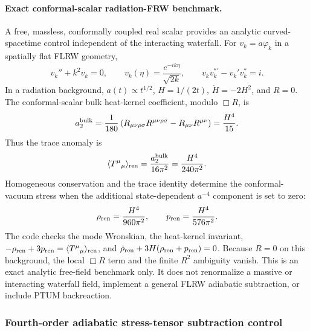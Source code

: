 \documentclass[epj]{svjour}
\begin{document}
\paragraph{Exact conformal-scalar radiation-FRW benchmark.}
A free, massless, conformally coupled real scalar provides an analytic
curved-spacetime control independent of the interacting waterfall.
For $v_k=a\varphi_k$ in a spatially flat FLRW geometry,
\begin{equation}
v_k''+k^2v_k=0,\qquad
v_k(\eta)=\frac{e^{-ik\eta}}{\sqrt{2k}},\qquad
v_kv_k^{*'}-v_k'v_k^*=i .
\end{equation}
In a radiation background, $a(t)\propto t^{1/2}$,
$H=1/(2t)$, $\dot H=-2H^2$, and $R=0$. The conformal-scalar
bulk heat-kernel coefficient, modulo $\Box R$, is
\begin{equation}
a_2^{\rm bulk}=\frac{1}{180}
\left(R_{\mu\nu\rho\sigma}R^{\mu\nu\rho\sigma}
-R_{\mu\nu}R^{\mu\nu}\right)
=\frac{H^4}{15}.
\end{equation}
Thus the trace anomaly is
\begin{equation}
\langle T^\mu{}_\mu\rangle_{\rm ren}
=\frac{a_2^{\rm bulk}}{16\pi^2}
=\frac{H^4}{240\pi^2}.
\end{equation}
Homogeneous conservation and the trace identity determine the
conformal-vacuum stress when the additional state-dependent
$a^{-4}$ component is set to zero:
\begin{equation}
\rho_{\rm ren}=\frac{H^4}{960\pi^2},\qquad
p_{\rm ren}=\frac{H^4}{576\pi^2}.
\end{equation}
The code checks the mode Wronskian, the heat-kernel invariant,
$-\rho_{\rm ren}+3p_{\rm ren}=\langle T^\mu{}_\mu\rangle_{\rm ren}$,
and $\dot\rho_{\rm ren}+3H(\rho_{\rm ren}+p_{\rm ren})=0$.
Because $R=0$ on this background, the local $\Box R$ term and the
finite $R^2$ ambiguity vanish. This is an exact analytic free-field
benchmark only. It does not renormalize a massive or interacting
waterfall field, implement a general FLRW adiabatic subtraction, or
include PTUM backreaction.



\subsubsection{Fourth-order adiabatic stress-tensor subtraction control}
\label{sec:ptum_adiabatic_stress_control}
\end{document}
